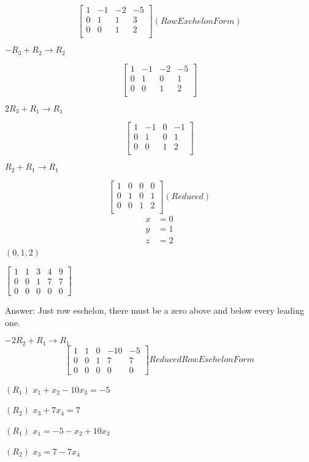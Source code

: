 \[	\begin{bmatrix}
	1 & -1 & -2 & -5 \\
	0 & 1 & 1 & 3 \\
	0 & 0 & 1 & 2 \\
\end{bmatrix}
(Row Exchelon Form)
\]

$-R_3 + R_2 \to R_2$

\[	\begin{bmatrix}
	1 & -1 & -2 & -5 \\
	0 & 1 & 0 & 1 \\
	0 & 0 & 1 & 2 \\
\end{bmatrix}
\]

$2R_3 + R_1 \to R_1$

\[	\begin{bmatrix}
	1 & -1 & 0 & -1 \\
	0 & 1 & 0 & 1 \\
	0 & 0 & 1 & 2 \\
\end{bmatrix}
\]

$R_2 + R_1 \to R_1$

\[	\begin{bmatrix}
	1 & 0 & 0 &  0\\
	0 & 1 & 0 & 1 \\
	0 & 0 & 1 & 2 \\
\end{bmatrix}
(Reduced)
\]
\begin{align*}
	x&= 0 \\
	y &= 1 \\
	z &= 2 \\
\end{align*}
$\boxed{(0,1,2)}$

\begin{example}
	$\begin{bmatrix}
		1 & 1 & 3 & 4 & 9 \\
		0 & 0 & 1 & 7 & 7 \\
		0 & 0 & 0 & 0 & 0
	\end{bmatrix} $
\end{example}

\begin{solution}[]
	Answer: Just row eschelon, there must be a zero above and below every leading one.

	$-2R_2 + R_1 \to R_1$
	\[
		\begin{bmatrix}
			1 & 1 & 0 & -10 & -5 \\
			0 & 0 & 1 & 7 & 7 \\
			0 & 0 & 0 & 0 & 0
		\end{bmatrix}
		Reduced Row Eschelon Form
	\]

	$(R_1)$
	$x_1+x_2 - 10x_3 = -5$

	$(R_2)$
	$x_3+7x_4  = 7$

	$(R_1)$
	$x_1= -5-x_2 + 10x_3 $

	$(R_2)$
	$x_3  = 7-7x_4$

\end{solution}

